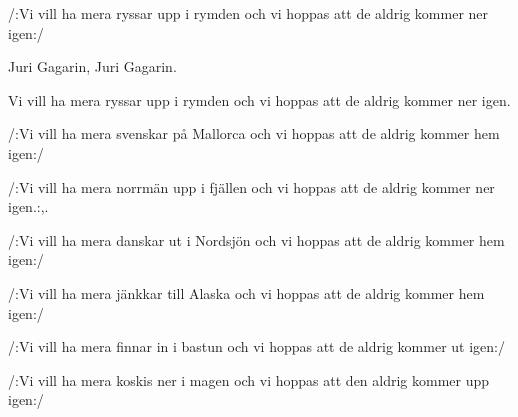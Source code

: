 


	
\beginverse*		%
/:Vi vill ha mera ryssar upp i rymden
och vi hoppas att de aldrig kommer ner igen:/
\endverse			%

\beginchorus
Juri Gagarin,
Juri Gagarin.
\endchorus

\beginverse*		%
Vi vill ha mera ryssar upp i rymden
och vi hoppas att de aldrig
kommer ner igen.
\endverse			%

\beginverse*		%
/:Vi vill ha mera svenskar på Mallorca
och vi hoppas att de aldrig kommer hem igen:/
\endverse			%

\beginverse*		%
/:Vi vill ha mera norrmän upp i fjällen
och vi hoppas att de aldrig kommer ner igen.:,.
\endverse			%

\beginverse*		%
/:Vi vill ha mera danskar ut i Nordsjön
och vi hoppas att de aldrig kommer hem igen:/
\endverse			%

\beginverse*		%
/:Vi vill ha mera jänkkar till Alaska
och vi hoppas att de aldrig kommer hem igen:/
\endverse			%

\beginverse*		%
/:Vi vill ha mera finnar in i bastun
och vi hoppas att de aldrig kommer ut igen:/
\endverse			%

\beginverse*		%
/:Vi vill ha mera koskis ner i magen
och vi hoppas att den aldrig kommer upp igen:/
\endverse			%
\endsong			%
